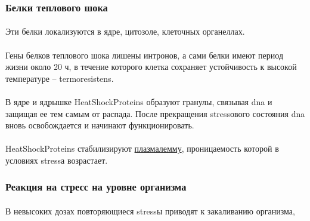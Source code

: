 \subsubsection*{Белки теплового шока}

\paragraph*{}Эти белки локализуются в ядре, цитозоле, клеточных органеллах. 

\paragraph*{}Гены \hypertarget{HeatShockProteins}{белков теплового шока} лишены интронов, а сами белки имеют период жизни около 20 ч, в течение которого клетка сохраняет устойчивость к высокой температуре -- \gls{termoresistens}. 

\paragraph*{}В ядре и ядрышке \gls{HeatShockProteins} образуют гранулы, связывая \gls{dna} и защищая ее тем самым от распада. После прекращения \gls{stress}ового состояния \gls{dna} вновь освобождается и начинают функционировать. 

\paragraph*{}\gls{HeatShockProteins} стабилизируют \hyperlink{plasmolema}{плазмалемму}, проницаемость которой в условиях \gls{stress}а возрастает. 

\subsubsection*{Реакция на стресс на уровне организма}

\paragraph*{}В невысоких дозах повторяющиеся \gls{stress}ы приводят к закаливанию организма, 

\paragraph*{}

